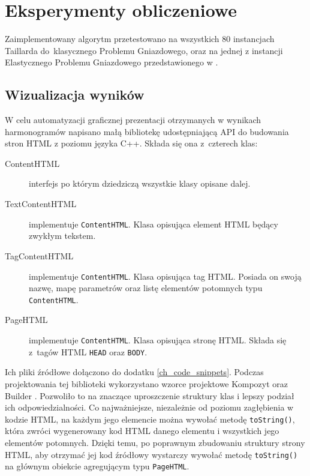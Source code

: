 \documentclass[archivemode]{mgr}
\begin{document}
\chapter{Eksperymenty obliczeniowe \label{ch_experiments}}
Zaimplementowany algorytm przetestowano na wszystkich 80 instancjach Taillarda do~klasycznego Problemu Gniazdowego, oraz na jednej z instancji Elastycznego Problemu Gniazdowego przedstawionego w \cite{Kacem2002a}.

\section{Wizualizacja wyników}
W celu automatyzacji graficznej prezentacji otrzymanych w wynikach harmonogramów napisano małą bibliotekę udostępniającą API do budowania stron HTML z poziomu języka C++. Składa się ona z~czterech klas:
\begin{description}
    \item [ContentHTML] interfejs po którym dziedziczą wszystkie klasy opisane dalej.
    \item [TextContentHTML] implementuje \texttt{ContentHTML}. Klasa opisująca element HTML będący zwykłym tekstem.
    \item [TagContentHTML] implementuje \texttt{ContentHTML}. Klasa opisująca tag HTML. Posiada on swoją nazwę, mapę parametrów oraz listę  elementów potomnych typu \texttt{ContentHTML}.
    \item [PageHTML] implementuje \texttt{ContentHTML}. Klasa opisująca stronę HTML. Składa się z~tagów HTML \texttt{HEAD} oraz \texttt{BODY}.
\end{description}
Ich pliki źródłowe dołączono do dodatku \ref{ch_code_snippets}. Podczas projektowania tej biblioteki wykorzystano wzorce projektowe Kompozyt oraz Builder \cite{GangOfFour}. Pozwoliło to na znaczące uproszczenie struktury klas i lepszy podział ich odpowiedzialności. Co najważniejsze, niezależnie od poziomu zagłębienia w kodzie HTML, na każdym jego elemencie można wywołać metodę \texttt{toString()}, która zwróci wygenerowany kod HTML danego elementu i wszystkich jego elementów potomnych. Dzięki temu, po poprawnym zbudowaniu struktury strony HTML, aby otrzymać jej kod źródłowy wystarczy wywołać metodę \texttt{toString()} na głównym obiekcie agregującym typu \texttt{PageHTML}.
%
\end{document}
